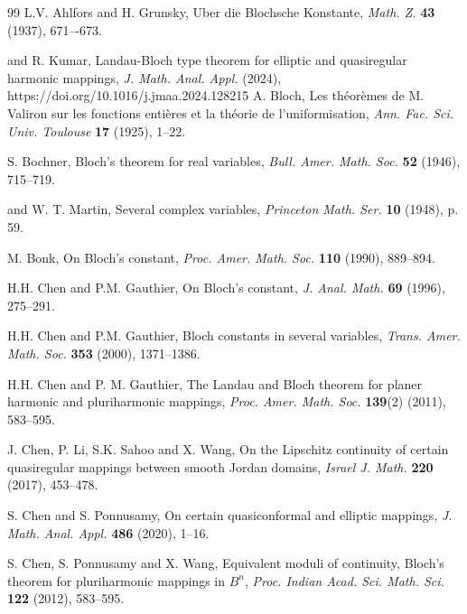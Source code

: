 \documentclass[a4paper,12pt,reqno]{amsart}
\theoremstyle{plain}
\theoremstyle{definition}
\numberwithin{equation}{section}
\begin{document}
\begin{thebibliography}{99}
  {\sc L.V. Ahlfors} and {\sc H. Grunsky}, Uber die Blochsche Konstante, {\it  Math. Z. } {\bf 43} (1937), 671–-673.

 and {\sc R. Kumar}, Landau-Bloch type theorem for elliptic and quasiregular harmonic mappings, {\it  J. Math. Anal. Appl. } (2024), https://doi.org/10.1016/j.jmaa.2024.128215
{\sc A. Bloch}, Les théorèmes de M. Valiron sur les fonctions entières et la théorie de l'uniformisation, {\it  Ann.
Fac. Sci. Univ. Toulouse } {\bf 17} (1925), 1--22.

{\sc S. Bochner}, Bloch's theorem for real variables, {\it Bull. Amer. Math. Soc.} {\bf 52 } (1946), 715--719.
 
  and {\sc W. T. Martin}, Several complex variables, {\it  Princeton Math. Ser.} {\bf 10} (1948), p. 59.
 
   {\sc M. Bonk}, On Bloch’s constant, {\it   Proc. Amer. Math. Soc.} {\bf 110} (1990), 889--894.
 
   {\sc H.H. Chen } and {\sc P.M. Gauthier},  On Bloch’s constant, {\it  J. Anal. Math.} {\bf 69} (1996), 275--291.
  
   {\sc H.H. Chen} and {\sc P.M. Gauthier}, Bloch constants in several variables, {\it Trans. Amer. Math. Soc.} {\bf 353} (2000), 1371--1386. 
  
   {\sc H.H. Chen} and {\sc P. M. Gauthier}, The Landau and Bloch theorem for planer harmonic and pluriharmonic mappings, {\it Proc. Amer. Math. Soc.} {\bf 139}(2) (2011), 583--595. 
  
     {\sc J. Chen}, {\sc P. Li}, {\sc S.K. Sahoo} and {\sc X. Wang}, On the Lipschitz continuity of certain quasiregular mappings between smooth Jordan domains, {\it Israel J. Math.} {\bf 220} (2017), 453--478.
  
   {\sc S. Chen } and {\sc S. Ponnusamy}, On certain quasiconformal and elliptic mappings, {\it  J. Math. Anal. Appl.} {\bf 486} (2020), 1--16.
  
   {\sc S. Chen}, {\sc S. Ponnusamy} and {\sc X. Wang}, Equivalent moduli of continuity, Bloch’s theorem for pluriharmonic mappings in $B^n$, {\it Proc. Indian Acad. Sci. Math. Sci.} {\bf 122} (2012), 583--595. 


\end{thebibliography}
\end{document}
